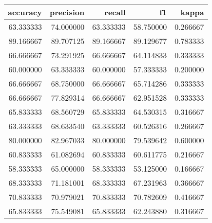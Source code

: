 \begin{tabular}{rrrrr}
\toprule
accuracy & precision & recall & f1 & kappa \\
\midrule
63.333333 & 74.000000 & 63.333333 & 58.750000 & 0.266667 \\
89.166667 & 89.707125 & 89.166667 & 89.129677 & 0.783333 \\
66.666667 & 73.291925 & 66.666667 & 64.114833 & 0.333333 \\
60.000000 & 63.333333 & 60.000000 & 57.333333 & 0.200000 \\
66.666667 & 68.750000 & 66.666667 & 65.714286 & 0.333333 \\
66.666667 & 77.829314 & 66.666667 & 62.951528 & 0.333333 \\
65.833333 & 68.560729 & 65.833333 & 64.530315 & 0.316667 \\
63.333333 & 68.633540 & 63.333333 & 60.526316 & 0.266667 \\
80.000000 & 82.967033 & 80.000000 & 79.539642 & 0.600000 \\
60.833333 & 61.082694 & 60.833333 & 60.611775 & 0.216667 \\
58.333333 & 65.000000 & 58.333333 & 53.125000 & 0.166667 \\
68.333333 & 71.181001 & 68.333333 & 67.231963 & 0.366667 \\
70.833333 & 70.979021 & 70.833333 & 70.782609 & 0.416667 \\
65.833333 & 75.549081 & 65.833333 & 62.243880 & 0.316667 \\
\bottomrule
\end{tabular}
